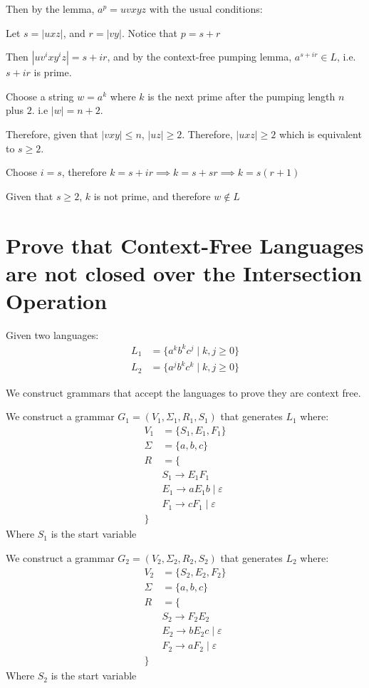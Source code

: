 \documentclass[11pt]{article}
\makeatletter
\newcommand{\mathleft}{\@fleqntrue\@mathmargin5pt}
\makeatother
\begin{document}
Then by the lemma, $a^p = uvxyz$ with the usual conditions:

Let $s = |uxz|$, and $r=|vy|$. Notice that $p=s+r$

Then $|uv^ixy^iz| = s+ ir$, and by the context-free pumping lemma, $a^{s+ir} \in
L$, i.e. $s + ir$ is prime.

Choose a string $w = a^k$ where $k$ is the next prime after the pumping length
$n$ plus $2$. i.e $|w| = n + 2$.

Therefore, given that $|vxy| \leq n$, $|uz| \geq 2$. Therefore, $|uxz| \geq 2$
which is equivalent to $s \geq 2$.

Choose $i = s$, therefore $k = s + ir \implies k = s + sr \implies k = s(r + 1)$

Given that $s \geq 2$, $k$ is not prime, and therefore $w \notin L$

\newpage
\section{Prove that Context-Free Languages are not closed over the Intersection
Operation}

Given two languages:
\begin{align*}
	L_1 &= \{a^k b^k c^j \mid k, j \geq 0 \} \\
	L_2 &= \{a^j b^k c^k \mid k, j \geq 0 \} 
\end{align*}

We construct grammars that accept the languages to prove they are context free.

We construct a grammar $G_1=(V_1,\Sigma_1,R_1,S_1)$ that generates $L_1$
where:
\mathleft
\begin{align*}
	V_1 &= \{S_1, E_1, F_1\} \\
	\Sigma &= \{a, b, c\} \\
	R &= \{ \\
	  & S_1 \to E_1F_1 \\
	  & E_1 \to aE_1b \mid \varepsilon \\
		& F_1 \to cF_1 \mid \varepsilon \\
	\}
\end{align*}
Where $S_1$ is the start variable

We construct a grammar $G_2=(V_2,\Sigma_2,R_2,S_2)$ that generates $L_2$
where:
\begin{align*}
	V_2 &= \{S_2, E_2, F_2\} \\
	\Sigma &= \{a, b, c\} \\
	R &= \{ \\
	  & S_2 \to F_2E_2 \\
	  & E_2 \to bE_2c \mid \varepsilon \\
		& F_2 \to aF_2 \mid \varepsilon \\
	\}
\end{align*}
Where $S_2$ is the start variable
\end{document}
